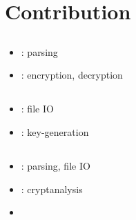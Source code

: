 \section{Contribution}



\subsection{\dd}
\begin{itemize}
\item \cry{} \cf: \cl{} parsing
\item \rsa{} \cs: encryption, decryption
\end{itemize}

\subsection{\md}
\begin{itemize}
\item \cry{} \cf: file IO
\item \rsa{} \cs: key-generation
\end{itemize}

\subsection{\vp}
\begin{itemize}
\item \cry{} \cf: \cl{} parsing, file IO
\item \rsa{} \cs: cryptanalysis
\item \dummy{} \cs
\end{itemize}
